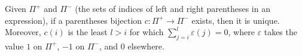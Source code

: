 Given $\Pi^+$ and $\Pi^-$ (the sets of indices of left and right parentheses in an expression), if a parentheses bijection $c: \Pi^+ \to \Pi^-$ exists, then it is unique. Moreover, $c(i)$ is the least $l > i$ for which $\sum_{j=i}^{l} \varepsilon(j) = 0$, where $\varepsilon$ takes the value $1$ on $\Pi^+$, $-1$ on $\Pi^-$, and $0$ elsewhere.
